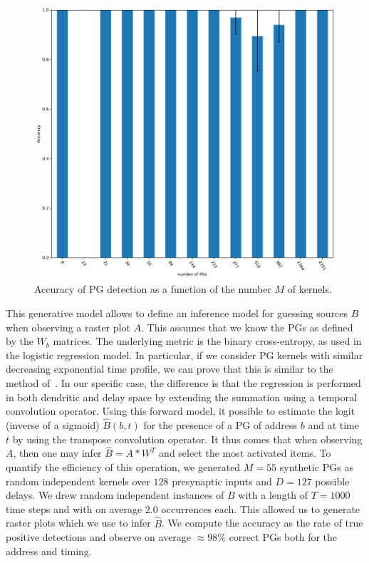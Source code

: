 \documentclass[11pt]{article}
\begin{document}
\begin{figure}
\vspace{-15pt}
\includegraphics[width=\linewidth]{figure_N_PGs.pdf}
\vspace{-25pt}
{
\caption{Accuracy of PG detection as a function of the number $M$ of kernels.
}
\label{fig:2}
}
\vspace{-10pt}
\end{figure}
This generative model allows to define an inference model for guessing sources $B$ when observing a raster plot $A$. This assumes that we know the PGs as defined by the $W_b$ matrices. The underlying metric is the binary cross-entropy, as used in the logistic regression model. In particular, if we consider PG kernels with similar decreasing exponential time profile, we can prove that this is similar to %
the method of~\citet{berens_fast_2012}. In our specific case, the difference is that the regression is performed in both dendritic and delay space by extending the summation using a temporal convolution operator. Using this forward model, it possible to estimate the logit (inverse of a sigmoid) $\hat{B}(b, t)$ for the presence of a PG of address $b$ and at time $t$ by using the transpose convolution operator. It thus comes that when observing $A$, then one may infer $\hat{B} = A \ast W^T$ and select the most activated items. To quantify the efficiency of this operation, we generated $M=55$ synthetic PGs as random independent kernels over $128$ presynaptic inputs and $D=127$ possible delays. We drew random independent instances of $B$ with a length of $T=1000$ time steps and with on average $2.0$ occurrences each. This allowed us to generate raster plots which we use to infer $\hat{B}$. We compute the accuracy as the rate of true positive detections and observe on average $\approx 98\%$ correct PGs both for the address and %
timing.
\end{document}
